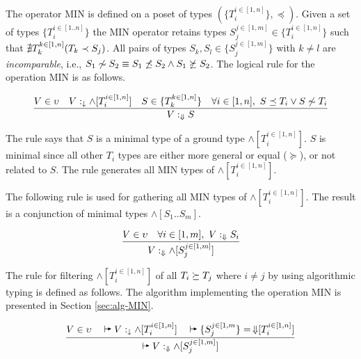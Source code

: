 \documentclass[runningheads]{llncs}
\newcommand{\darr}{\downarrow}
\newcommand{\Darr}{\Downarrow}
\newcommand{\vdasharr}{%
    \mathrel{%
        \vdash\hspace*{-5pt}%
        \raisebox{2.3pt}{\scalebox{.5}{\(\blacktriangleright\)}}%
    }%
}\newcommand{\D}{{\Delta}}
\newcommand{\memo}[1]{}
\begin{document}
\memo{the type $\land[T_i^{i\in[1,n]}]$ It makes sense
either to compute MIN or MAX of $\land[T_i^{i\in[1,n]}]$ yielding
$\land[S_1..S_m]$ where $m\le\/n$ and
$S_j^{j\in[1,m]}\in\{T_i^{i\in[1,n]}\}$. The operator MIN computes
$S_j^{j\in[1,m]}$ such that each $S_j$ is minimal among
$T_i^{i\in[1,n]}$. The operator MAX computes $S_j^{j\in[1,m]}$ such
that each $S_j$ is maximal among $T_i^{i\in[1,n]}$. Note that in both
cases there are no pairs among $S_j^{j\in[1,m]}$ related by $\preceq$.}

The operator MIN is defined on a poset of types
$(\{T_i^{i\in[1,n]}\},\preceq)$. Given a set of types $\{T_i^{i\in[1..n]}\}$
the MIN operator retains types $S_j^{j\in[1,m]}\in\{T_i^{i\in[1,n]}\}$
such that ${\nexists}\/T_k^{k\in[1,n]}(T_k\prec\/S_j)$. All pairs of
types $S_k,S_l\in\{S_j^{j\in[1,m]}\}$ with $k\not=l$ are
\emph{incomparable}, i.e.,
$S_1\not\sim\/S_2\equiv\/S_1\not\preceq\/S_2\land\/S_1\not\succeq\/S_2$.
The logical rule for the operation MIN is as follows.

\begin{equation}
\label{rul:min}
\dfrac{V\in\upsilon\quad\/V:_\darr\land[T_i^{i\in[1,n]}]\quad\/S\in\/\{T_k^{k\in[1,n]}\}\quad\forall\/i\in[1,n],\ S\preceq\/T_i\lor\/S\not\sim\/T_i}
      {V:_{\Darr}S}
\end{equation}

The rule says that $S$ is a minimal type of a ground type
$\land[T_i^{i\in[1,n]}]$. $S$ is minimal since all other $T_i$ types are
either more general or equal ($\succeq$), or not related to $S$. The
rule generates all MIN types of $\land[T_i^{i\in[1,n]}]$.

The following rule is used for gathering all MIN types of
$\land[T_i^{i\in[1,n]}]$. The result is a conjunction of minimal types
$\land[S_1..S_m]$.

\begin{equation}
\label{rul:min-gather}
\dfrac{V\in\upsilon\quad\forall\/i\in[1,m],\ V:_\Darr\/S_i}
      {V:_{\Darr}\land[S_j^{j\in[1,m]}]}
\end{equation}


The rule for filtering $\land[T_i^{i\in[1,n]}]$ of all
$T_i\succeq\/T_j$ where $i\not=j$ by using algorithmic typing is
defined as follows. The algorithm implementing the operation MIN is
presented in Section \ref{sec:alg-MIN}.

\begin{equation}
\label{rul:alg-min}
\dfrac{V\in\upsilon\quad\vdasharr\/V:_\darr\land[T_i^{i\in[1,n]}]\quad\vdasharr\/\{S_j^{j\in[1,m}\}=\,\Darr\kern -3pt[T_i^{i\in[1,n]}]}
{\vdasharr\/V:_{\Darr}\land\/[S_j^{j\in[1,m]}]}
\end{equation}
\end{document}
